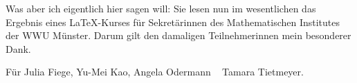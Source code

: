 Was aber ich eigentlich hier sagen will: Sie lesen nun im wesentlichen das Ergebnis eines \LaTeX-Kurses für Sekretärinnen des Mathematischen Institutes der WWU Münster. Darum gilt den damaligen Teilnehmerinnen mein besonderer Dank.

\newpage\mbox{}\vfill
\begin{center}
\large
Für Julia Fiege, Yu-Mei Kao, Angela Odermann \amper~ Tamara Tietmeyer.
\normalsize
\end{center}
\vfill\mbox{}\newpage
